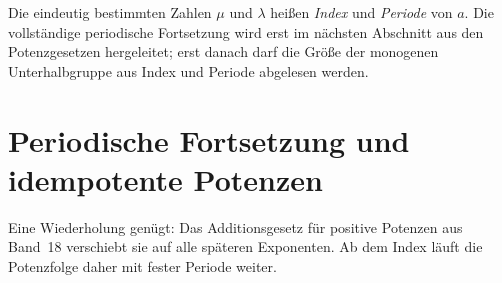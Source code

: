 \documentclass[main.tex]{subfiles}
\begin{document}
\begin{tabproofwide}
\end{tabproofwide}

Die eindeutig bestimmten Zahlen \(\mu\) und \(\lambda\) heißen
\emph{Index} und \emph{Periode} von \(a\).  Die vollständige periodische
Fortsetzung wird erst im nächsten Abschnitt aus den Potenzgesetzen
hergeleitet; erst danach darf die Größe der monogenen Unterhalbgruppe aus
Index und Periode abgelesen werden.

\section{Periodische Fortsetzung und idempotente Potenzen}

Eine Wiederholung genügt: Das Additionsgesetz für positive Potenzen aus
Band~18 verschiebt sie auf alle späteren Exponenten.  Ab dem Index läuft die
Potenzfolge daher mit fester Periode weiter.
\end{document}
